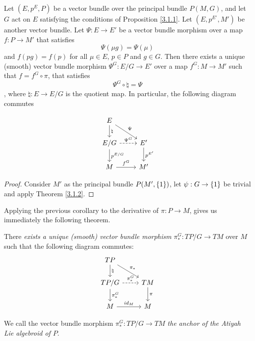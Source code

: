 \begin{corollary}
Let $(E, p^E, P)$ be a vector bundle over the principal bundle $P(M, G)$, and let $G$ act on $E$ satisfying the conditions of Proposition \ref{3.1.1}. Let $(E, p^{E'}, M')$ be another vector bundle. Let $\Psi: E \to E'$ be a vector bundle morphism over a map $f: P \to M'$ that satisfies \[\Psi(\mu g) = \Psi(\mu)\] and $f(pg) = f(p)$ for all $\mu \in E$, $p \in P$ and $g \in G$. Then there exists a unique (smooth) vector bundle morphism $\Psi^{G}: E/G \to E'$ over a map $f^{G}: M \to M'$ such that $f = f^{G} \circ \pi$, that satisfies \[\Psi^{G} \circ \natural = \Psi\], where $\natural: E \to E/G$ is the quotient map. In particular, the following diagram commutes

\begin{equation} \label{anchorDiagram}
    \begin{tikzcd}
    E \arrow[]{d}{\natural} \arrow[]{dr}{\Psi}& \\
    E/G \arrow[dashed]{r}{\Psi^{G}} \arrow[]{d}{p^{E/G}}& E' \arrow[]{d}{p^{E'}} \\
    M \arrow[]{r}{f^{G}} & M'
    \end{tikzcd}
\end{equation}
\end{corollary}

\begin{proof}
Consider $M'$ as the principal bundle $P(M', \left\{ 1 \right\})$, let $\psi:G \to \left\{ 1 \right\}$ be trivial and apply Theorem \ref{3.1.2}.
\end{proof}

Applying the previous corollary to the derivative of $\pi: P \to M$, gives us immediately the following theorem.

\begin{theorem}\label{anchorAtiyah}
There \emph{exists a unique (smooth) vector bundle morphism} $\pi_*^G: TP/G \to TM$ over $M$ such that the following diagram commutes:
\begin{equation} \label{anchorDiagram}
    \begin{tikzcd}
    TP \arrow[]{d}{\natural} \arrow[]{dr}{\pi_*}& \\
    TP/G \arrow[dashed]{r}{\pi^G_*} \arrow[]{d}{\pi_*^G}& TM \arrow[]{d}{\pi} \\
    M \arrow[]{r}{id_M} & M
    \end{tikzcd}
\end{equation}

We call the vector bundle morphism $\pi^G_*:TP/G \to TM$ \emph{the anchor of the Atiyah Lie algebroid of $P$}.
\end{theorem}

